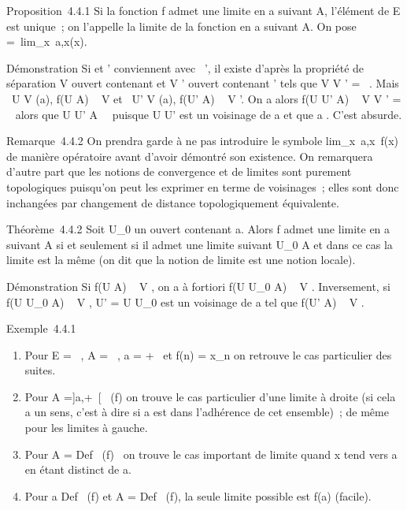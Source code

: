 \documentclass[]{article}
\begin{document}
Proposition~4.4.1 Si la fonction f admet une limite en a suivant A,
l'élément \ell de E est unique~; on l'appelle la limite de la fonction en a
suivant A. On pose \ell =\
lim_x\rightarrow~a,x\inAf(x).

Démonstration Si \ell et \ell' conviennent avec \ell\neq~\ell', il existe d'après la
propriété de séparation V ouvert contenant \ell et V ' ouvert contenant \ell'
tels que V \bigcap V ' = \varnothing~. Mais \exists~U \in V (a), f(U \bigcap
A) \subset~ V et \exists~U' \in V (a), f(U' \bigcap A) \subset~ V '. On a
alors f(U \bigcap U' \bigcap A) \subset~ V \bigcap V ' = \varnothing~ alors que U \bigcap U' \bigcap
A\neq~\varnothing~ puisque U \bigcap U' est un voisinage de a et
que a \in\overlineA. C'est absurde.

Remarque~4.4.2 On prendra garde à ne pas introduire le symbole
lim_x\rightarrow~a,x\inA~f(x) de manière opératoire
avant d'avoir démontré son existence. On remarquera d'autre part que les
notions de convergence et de limites sont purement topologiques
puisqu'on peut les exprimer en terme de voisinages~; elles sont donc
inchangées par changement de distance topologiquement équivalente.

Théorème~4.4.2 Soit U_0 un ouvert contenant a. Alors f admet
une limite en a suivant A si et seulement si il admet une limite suivant
U_0 \bigcap A et dans ce cas la limite est la même (on dit que la
notion de limite est une notion locale).

Démonstration Si f(U \bigcap A) \subset~ V , on a à fortiori f(U \bigcap U_0 \bigcap A)
\subset~ V . Inversement, si f(U \bigcap U_0 \bigcap A) \subset~ V , U' = U \bigcap
U_0 est un voisinage de a tel que f(U' \bigcap A) \subset~ V .

Exemple~4.4.1

\begin{enumerate}
\itemsep1pt\parskip0pt
\item
  Pour E = \overline{}~, A = ~, a = +\infty~ et f(n) =
  x_n on retrouve le cas particulier des suites.
\item
  Pour A ={]}a,+\infty~{[}\bigcapDef~ (f) on trouve le cas
  particulier d'une limite à droite (si cela a un sens, c'est à dire si
  a est dans l'adhérence de cet ensemble)~; de même pour les limites à
  gauche.
\item
  Pour A = Def~ (f)
  \diagdown\a\ on trouve le cas important de
  limite quand x tend vers a en étant distinct de a.
\item
  Pour a \in Def~ (f) et A
  = Def~ (f), la seule limite possible est f(a)
  (facile).
\end{enumerate}
\end{document}
